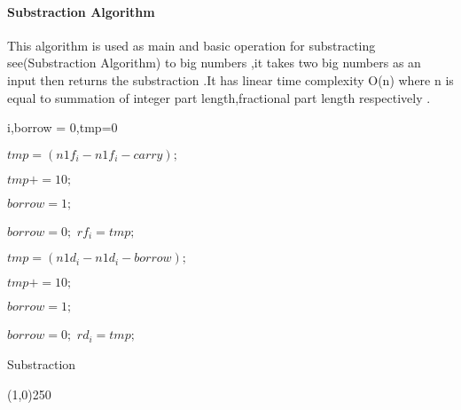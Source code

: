 \paragraph{Substraction Algorithm}
This algorithm is used as main and basic operation for substracting see(Substraction Algorithm) to big numbers ,it takes two big numbers as an input then returns the substraction .It has linear time complexity O(n) where n is equal to summation of integer part length,fractional part length respectively . 
\newline\newline\newline\newline\newline\newline\newline\newline\newline
\begin{algorithm}[H]
	\SetAlgoLined
	i,borrow = 0,tmp=0\;
	
	{
		
		$tmp = (n1f_{i} - n1f_{i} - carry);$
		
		
 	 	 {
  	 	 	$tmp += 10;$
  	 	 
  	 	    $borrow = 1;$
   	 	}
 	 	{
  			$borrow  = 0;$
		}
		$rf_{i} =  tmp;$ 
		
	}
	
	{
			$tmp = (n1d_{i} - n1d_{i} - borrow);$
		
		
		{
			$tmp += 10;$
			
			$borrow = 1;$
		}
		{
			$borrow  = 0;$
		}
		$rd_{i} =  tmp;$ 
	
	}
	\caption{Substraction}
	\label{substraction_algorithm}
\end{algorithm}



\newpage
\begin{center}
	\line(1,0){250}
\end{center}
